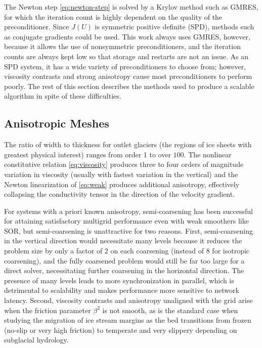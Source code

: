 The Newton step \eqref{eq:newton-step} is solved by a Krylov method such as GMRES, for which the iteration count is highly dependent on the quality of the preconditioner.  Since $J(U)$ is symmetric positive definite (SPD), methods such as conjugate gradients could be used. This work always uses GMRES, however, because it allows the use of nonsymmetric preconditioners, and the iteration counts are always kept low so that storage and restarts are not an issue.  As an SPD system, it has a wide variety of preconditioners to choose from; however, viscosity contrasts and strong anisotropy cause most preconditioners to perform poorly.  The rest of this section describes the methods used to produce a scalable algorithm in spite of these difficulties.

\subsection{Anisotropic Meshes}
The ratio of width to thickness for outlet glaciers (the regions of ice sheets with greatest physical interest) ranges from order 1 to over $100$.  The nonlinear constitutive relation \eqref{eq:viscosity} produces three to four orders of magnitude variation in viscosity (usually with fastest variation in the vertical) and the Newton linearization of \eqref{eq:weak} produces additional anisotropy, effectively collapsing the conductivity tensor in the direction of the velocity gradient.

For systems with a priori known anisotropy, semi-coarsening has been successful for attaining
satisfactory multigrid performance even with weak smoothers like SOR, but semi-coarsening is
unattractive for two reasons.  First, semi-coarsening in the vertical direction would necessitate
many levels because it reduces the problem size by only a factor of 2 on each coarsening (instead of
8 for isotropic coarsening), and the fully coarsened problem would still be far too large for a
direct solver, necessitating further coarsening in the horizontal direction.  The presence of many
levels leads to more synchronization in parallel, which is detrimental to scalability and makes
performance more sensitive to network latency.  Second, viscosity contrasts and anisotropy
unaligned with the grid arise when the friction parameter $\beta^2$ is not smooth, as is the standard
case when studying the migration of ice stream margins as the bed transitions from frozen (no-slip
or very high friction) to temperate and very slippery depending on subglacial hydrology.

